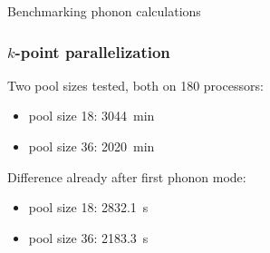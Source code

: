 \documentclass[aspectratio=169]{beamer}
\begin{document}
	



\begin{frame}
	\begin{center}
		{\huge Benchmarking phonon calculations}
	\end{center}
\end{frame}

\begin{frame}
	\frametitle{\(k\)-point parallelization}

	Two pool sizes tested, both on 180 processors:
	\begin{itemize}
		\item pool size 18: \SI{3044}{\minute}
    	\item pool size 36: \SI{2020}{\minute}
	\end{itemize}

	\vspace{10pt}

	Difference already after first phonon mode:
	\begin{itemize}
		\item pool size 18: \SI{2832.1}{\second}
		\item pool size 36: \SI{2183.3}{\second}
	\end{itemize}
\end{frame}
\end{document}
